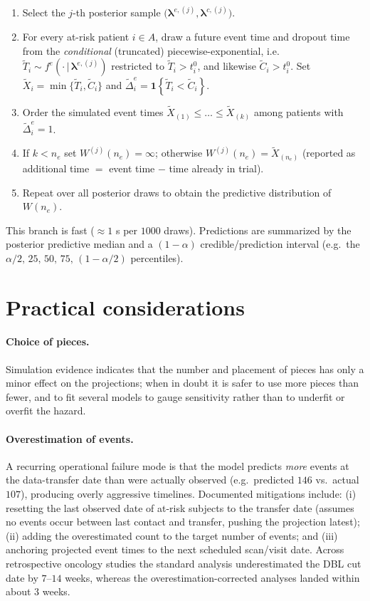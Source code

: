 \documentclass[11pt]{article}
\newcommand{\given}{\,\vert\,}
\newcommand{\ind}[1]{\mathbf{1}\!\left\{#1\right\}}
\begin{document}
\begin{enumerate}[leftmargin=*]
  \item Select the $j$-th posterior sample $\big(\bm\lambda^{e,(j)},
  \bm\lambda^{c,(j)}\big)$.
  \item For every at-risk patient $i \in A$, draw a future event time and
  dropout time from the \emph{conditional} (truncated) piecewise-exponential,
  i.e.\ $\widetilde{T}_i \sim f^{e}(\cdot \given \bm\lambda^{e,(j)})$
  restricted to $\widetilde{T}_i > t^0_i$, and likewise
  $\widetilde{C}_i > t^0_i$. Set
  $\widetilde{X}_i = \min\{\widetilde{T}_i,\widetilde{C}_i\}$ and
  $\widetilde{\Delta}^e_i = \ind{\widetilde{T}_i < \widetilde{C}_i}$.
  \item Order the simulated event times
  $\widetilde{X}_{(1)} \le \dots \le \widetilde{X}_{(k)}$ among patients with
  $\widetilde{\Delta}^e_i = 1$.
  \item If $k < n_e$ set $W^{(j)}(n_e) = \infty$; otherwise
  $W^{(j)}(n_e) = \widetilde{X}_{(n_e)}$ (reported as additional time
  $=$ event time $-$ time already in trial).
  \item Repeat over all posterior draws to obtain the predictive distribution
  of $W(n_e)$.
\end{enumerate}
This branch is fast ($\approx 1$ s per $1000$ draws). Predictions are summarized
by the posterior predictive median and a $(1-\alpha)$ credible/prediction
interval (e.g.\ the $\alpha/2,\,25,\,50,\,75,\,(1-\alpha/2)$ percentiles).

\section{Practical considerations}

\paragraph{Choice of pieces.} Simulation evidence indicates that the number and
placement of pieces has only a minor effect on the projections; when in doubt
it is safer to use more pieces than fewer, and to fit several models to gauge
sensitivity rather than to underfit or overfit the hazard.

\paragraph{Overestimation of events.} A recurring operational failure mode is
that the model predicts \emph{more} events at the data-transfer date than were
actually observed (e.g.\ predicted $146$ vs.\ actual $107$), producing overly
aggressive timelines. Documented mitigations include: (i) resetting the last
observed date of at-risk subjects to the transfer date (assumes no events occur
between last contact and transfer, pushing the projection latest); (ii) adding
the overestimated count to the target number of events; and (iii) anchoring
projected event times to the next scheduled scan/visit date. Across
retrospective oncology studies the standard analysis underestimated the DBL cut
date by $7$--$14$ weeks, whereas the overestimation-corrected analyses landed
within about $3$ weeks.
\end{document}
